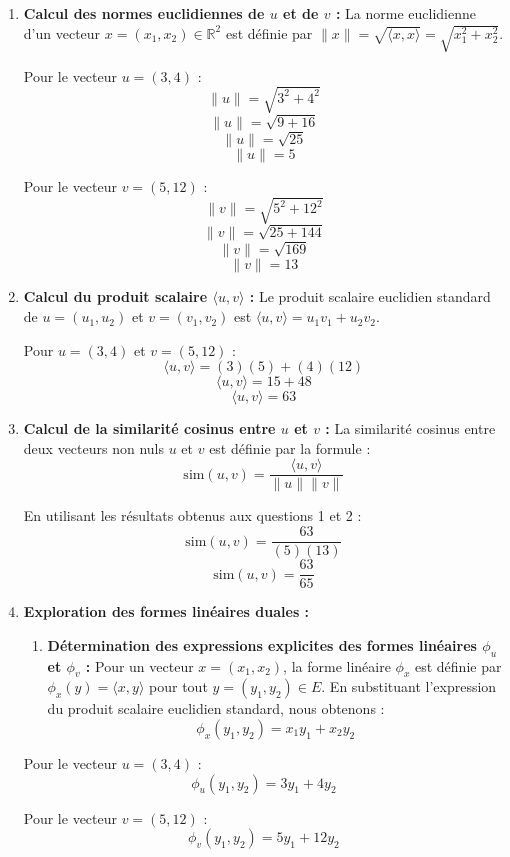 \documentclass[11pt,a4paper]{report}
\begin{document}
\begin{enumerate}
\def\labelenumi{\arabic{enumi}.}
\item
  \textbf{Calcul des normes euclidiennes de \(u\) et de \(v\) :} La
  norme euclidienne d'un vecteur \(x = (x_1, x_2) \in \mathbb{R}^2\) est
  définie par
  \(\|x\| = \sqrt{\langle x, x \rangle} = \sqrt{x_1^2 + x_2^2}\).

  Pour le vecteur \(u = (3, 4)\) : \[ \|u\| = \sqrt{3^2 + 4^2} \]
  \[ \|u\| = \sqrt{9 + 16} \] \[ \|u\| = \sqrt{25} \] \[ \|u\| = 5 \]

  Pour le vecteur \(v = (5, 12)\) : \[ \|v\| = \sqrt{5^2 + 12^2} \]
  \[ \|v\| = \sqrt{25 + 144} \] \[ \|v\| = \sqrt{169} \]
  \[ \|v\| = 13 \]
\item
  \textbf{Calcul du produit scalaire \(\langle u, v \rangle\) :} Le
  produit scalaire euclidien standard de \(u = (u_1, u_2)\) et
  \(v = (v_1, v_2)\) est \(\langle u, v \rangle = u_1 v_1 + u_2 v_2\).

  Pour \(u = (3, 4)\) et \(v = (5, 12)\) :
  \[ \langle u, v \rangle = (3)(5) + (4)(12) \]
  \[ \langle u, v \rangle = 15 + 48 \] \[ \langle u, v \rangle = 63 \]
\item
  \textbf{Calcul de la similarité cosinus entre \(u\) et \(v\) :} La
  similarité cosinus entre deux vecteurs non nuls \(u\) et \(v\) est
  définie par la formule :
  \[ \text{sim}(u, v) = \frac{\langle u, v \rangle}{\|u\| \|v\|} \]

  En utilisant les résultats obtenus aux questions 1 et 2 :
  \[ \text{sim}(u, v) = \frac{63}{(5)(13)} \]
  \[ \text{sim}(u, v) = \frac{63}{65} \]
\item
  \textbf{Exploration des formes linéaires duales :}

  \begin{enumerate}
  \def\labelenumii{\alph{enumii}.}

  \item
    \textbf{Détermination des expressions explicites des formes
    linéaires \(\phi_u\) et \(\phi_v\) :} Pour un vecteur
    \(x = (x_1, x_2)\), la forme linéaire \(\phi_x\) est définie par
    \(\phi_x(y) = \langle x, y \rangle\) pour tout
    \(y = (y_1, y_2) \in E\). En substituant l'expression du produit
    scalaire euclidien standard, nous obtenons :
    \[ \phi_x(y_1, y_2) = x_1 y_1 + x_2 y_2 \]
  \end{enumerate}

  Pour le vecteur \(u = (3, 4)\) : \[ \phi_u(y_1, y_2) = 3y_1 + 4y_2 \]

  Pour le vecteur \(v = (5, 12)\) :
  \[ \phi_v(y_1, y_2) = 5y_1 + 12y_2 \]


\end{enumerate}
\end{document}
